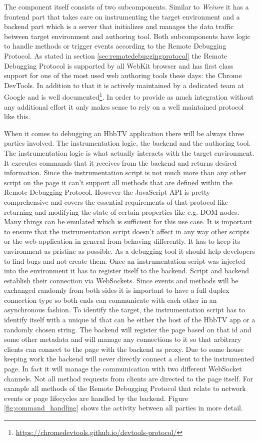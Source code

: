 The component itself consists of two subcomponents. Similar to \textit{Weinre} it has a frontend part that takes care on instrumenting the target environment and a backend part which is a server that initializes and manages the data traffic between target environment and authoring tool. Both subcomponents have logic to handle methods or trigger events according to the Remote Debugging Protocol. As stated in section \ref{sec:remotedebuggingprotocol} the Remote Debugging Protocol is supported by all WebKit browser and has first class support for one of the most used web authoring tools these days: the Chrome DevTools. In addition to that it is actively maintained by a dedicated team at Google and is well documented\footnote{\url{https://chromedevtools.github.io/devtools-protocol/}}. In order to provide as much integration without any additional effort it only makes sense to rely on a well maintained protocol like this.

When it comes to debugging an HbbTV application there will be always three parties involved. The instrumentation logic, the backend and the authoring tool. The instrumentation logic is what actually interacts with the target environment. It executes commands that it receives from the backend and returns desired information. Since the instrumentation script is not much more than any other script on the page it can't support all methods that are defined within the Remote Debugging Protocol. However the JavaScript API is pretty comprehensive and covers the essential requirements of that protocol like returning and modifying the state of certain properties like e.g. DOM nodes. Many things can be emulated which is sufficient for this use case. It is important to ensure that the instrumentation script doesn't affect in any way other scripts or the web application in general from behaving differently. It has to keep its environment as pristine as possible. As a debugging tool it should help developers to find bugs and not create them. Once an instrumentation script was injected into the environment it has to register itself to the backend. Script and backend establish their connection via WebSockets. Since events and methods will be exchanged randomly from both sides it is important to have a full duplex connection type so both ends can communicate with each other in an asynchronous fashion. To identify the target, the instrumentation script has to identify itself with a unique id that can be either the host of the HbbTV app or a randomly chosen string. The backend will register the page based on that id and some other metadata and will manage any connections to it so that arbitrary clients can connect to the page with the backend as proxy. Due to some house keeping work the backend will never directly connect a client to the instrumented page. In fact it will manage the communication with two different WebSocket channels. Not all method requests from clients are directed to the page itself. For example all methods of the Remote Debugging Protocol that relate to network events or page lifecycles are handled by the backend. Figure \ref{fig:command_handling} shows the activity between all parties in more detail.

